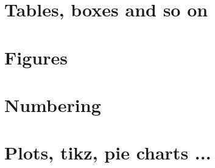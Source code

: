 \documentclass[14pt]{extreport}
\begin{document}
\chapter{Tables, boxes and so on}



\chapter{Figures}


\chapter{Numbering}
%

\chapter{Plots, tikz, pie charts ...}

\end{document}
